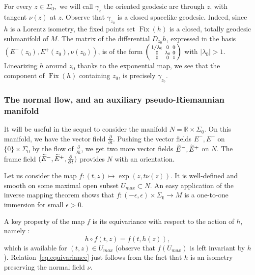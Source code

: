 \documentclass[11pt]{article}
\theoremstyle{definition}
\numberwithin{equation}{section}
\numberwithin{figure}{section}
\numberwithin{table}{section}
\DeclareMathOperator{\Fix}{Fix}
\newcommand*\RR{\mathbb{R}}
\let\oldtilde\tilde
\renewcommand*\tilde[1]{\mathchoice{\widetilde{#1}}{\widetilde{#1}}{\widetilde{#1}}{\oldtilde{#1}}}
\newenvironment{smallpmatrix}{\left(\begin{smallmatrix}}{\end{smallmatrix}\right)}
\newcommand*{\sfrac}[2]{#1/#2}
\begin{document}
For every $z \in \Sigma_0,$ we will call $\gamma_z$ the oriented geodesic arc through $z$, with tangent $\nu(z)$ at $z$. Observe that $\gamma_{z_0}$ is a closed spacelike geodesic. Indeed, since $h$ is a Lorentz isometry, the fixed points set $\Fix(h)$ is a closed, totally geodesic submanifold of $M$. The matrix of the differential $D_{z_0}h$, expressed in the basis $(E^-(z_0),E^+(z_0), \nu(z_0))$, is of the form $
\begin{smallpmatrix} \sfrac{1}{\lambda_0}&0&0\\ 0& \lambda_0&0\\ 0&0&1
\end{smallpmatrix}$ with $|\lambda_0|>1$. Linearizing $h$
around $z_0$ thanks to the exponential map, we see that the component of $\Fix(h)$ containing $z_0$, is precisely $\gamma_{z_0}$.



\subsubsection{The normal flow, and an auxiliary pseudo-Riemannian manifold}\label{sec.normalflow}
It will be useful in the sequel to consider the manifold $N=\RR \times
\Sigma_0$. On this manifold, we have the vector field $\frac{\partial}{\partial t}$. Pushing the vector fields $E^-,E^+$ on $\{ 0 \} \times \Sigma_0$ by the flow of $\frac{\partial}{\partial t}$, we get two more vector fields $\tilde{E}^-,\tilde{E}^+$ on $N$. The frame field $(\tilde{E}^-,\tilde{E}^+,\frac{\partial}{\partial t})$ provides $N$ with an orientation.


Let us consider the map $f: (t,z) \mapsto \exp(z,t\nu(z))$. It is well-defined and smooth on some maximal open subset $U_{max} \subset N$. An easy application of the inverse mapping theorem shows that $f: (-\epsilon,\epsilon) \times \Sigma_0 \to M$ is a one-to-one immersion for small $\epsilon >0$.



A key property of the map $f$ is its equivariance with respect to the action of $h$, namely :
\begin{equation}\label{eq.equivariance}
h \circ f(t,z) = f(t,h(z)),
\end{equation}
which is available for $(t,z) \in U_{max}$ (observe that $f(U_{max})$ is left invariant by $h$). Relation~\eqref{eq.equivariance} just follows from the fact that $h$ is an isometry preserving the normal field $\nu$.
\end{document}
